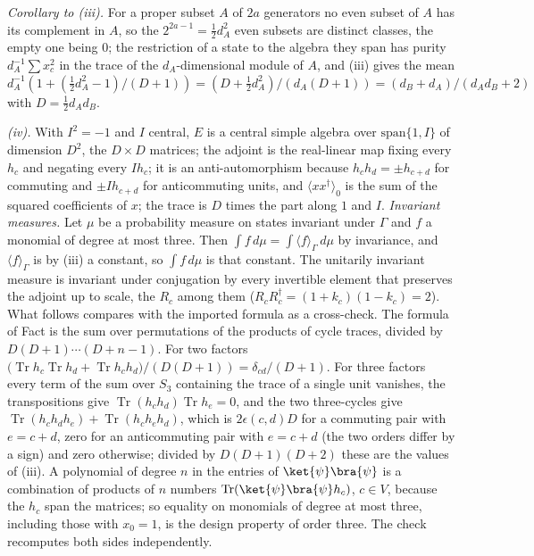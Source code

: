 \emph{Corollary to (iii).} For a proper subset $A$ of $2a$ generators no even subset of $A$ has its complement in $A$, so the $2^{2a-1} = \tfrac12d_{A}^{2}$ even subsets are distinct classes, the empty one being $0$; the restriction of a state to the algebra they span has purity $d_{A}^{-1}\sum x_{c}^{2}$ in the trace of the $d_{A}$-dimensional module of $A$, and (iii) gives the mean $d_{A}^{-1}(1 + (\tfrac12d_{A}^{2} - 1)/(D+1)) = (D + \tfrac12d_{A}^{2})/(d_{A}(D+1)) = (d_{B} + d_{A})/(d_{A}d_{B} + 2)$ with $D = \tfrac12d_{A}d_{B}$.

\emph{(iv).} With $I^{2} = -1$ and $I$ central, $E$ is a central simple algebra over $\mathrm{span}\{1, I\}$ of dimension $D^{2}$, the $D\times D$ matrices; the adjoint is the real-linear map fixing every $h_{c}$ and negating every $Ih_{c}$; it is an anti-automorphism because $h_{c}h_{d} = \pm h_{c+d}$ for commuting and $\pm Ih_{c+d}$ for anticommuting units, and $\langle xx^{\dagger}\rangle_{0}$ is the sum of the squared coefficients of $x$; the trace is $D$ times the part along $1$ and $I$. \emph{Invariant measures.} Let $\mu$ be a probability measure on states invariant under $\Gamma$ and $f$ a monomial of degree at most three. Then $\int f\,d\mu = \int\langle f\rangle_{\Gamma}\,d\mu$ by invariance, and $\langle f\rangle_{\Gamma}$ is by (iii) a constant, so $\int f\,d\mu$ is that constant. The unitarily invariant measure is invariant under conjugation by every invertible element that preserves the adjoint up to scale, the $R_{c}$ among them ($R_{c}R_{c}^{\dagger} = (1 + k_{c})(1 - k_{c}) = 2$). What follows compares with the imported formula as a cross-check. The formula of Fact  is the sum over permutations of the products of cycle traces, divided by $D(D+1)\cdots(D+n-1)$. For two factors $\bigl(\operatorname{Tr}h_{c}\operatorname{Tr}h_{d} + \operatorname{Tr}h_{c}h_{d}\bigr)/(D(D+1)) = \delta_{cd}/(D+1)$. For three factors every term of the sum over $S_{3}$ containing the trace of a single unit vanishes, the transpositions give $\operatorname{Tr}(h_{c}h_{d})\operatorname{Tr}h_{e} = 0$, and the two three-cycles give $\operatorname{Tr}(h_{c}h_{d}h_{e}) + \operatorname{Tr}(h_{c}h_{e}h_{d})$, which is $2\epsilon(c,d)D$ for a commuting pair with $e = c + d$, zero for an anticommuting pair with $e = c + d$ (the two orders differ by a sign) and zero otherwise; divided by $D(D+1)(D+2)$ these are the values of (iii). A polynomial of degree $n$ in the entries of $\ket{\psi}\bra{\psi}$ is a combination of products of $n$ numbers $\operatorname{Tr}(\ket{\psi}\bra{\psi}h_{c})$, $c \in V$, because the $h_{c}$ span the matrices; so equality on monomials of degree at most three, including those with $x_{0} = 1$, is the design property of order three. The check recomputes both sides independently.

